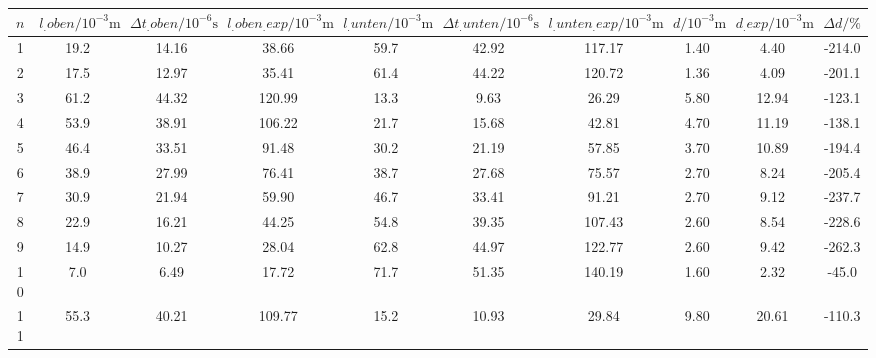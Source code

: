 \label{tab:tabAScan2}
	\begin{tabular}{S[table-format=1.0]S[table-format=2.1]S[table-format=2.2]S[table-format=2.2]S[table-format=2.1]S[table-format=2.2]S[table-format=2.2]S[table-format=2.2]S[table-format=2.2]S[table-format=2.1]}
		\toprule
		{$n$} & {$l_.{oben}/10^{-3}\si{\metre}$} & {$\Delta t_.{oben}/10^{-6}\si{\second}$} & {$l_.{oben_.{exp}}/10^{-3}\si{\metre}$} & {$l_.{unten}/10^{-3}\si{\metre}$} & {$\Delta t_.{unten}/10^{-6}\si{\second}$} & {$l_.{unten_.{exp}}/10^{-3}\si{\metre}$} & {$d/10^{-3}\si{\metre}$} & {$d_.{exp}/10^{-3}\si{\metre}$} & {$\Delta d/\%$} \\
		 & 19.2 & 14.16 & 38.66 & 59.7 & 42.92 & 117.17 & 1.40 & 4.40 & -214.0 \\
		2 & 17.5 & 12.97 & 35.41 & 61.4 & 44.22 & 120.72 & 1.36 & 4.09 & -201.1 \\
		3 & 61.2 & 44.32 & 120.99 & 13.3 & 9.63 & 26.29 & 5.80 & 12.94 & -123.1 \\
		4 & 53.9 & 38.91 & 106.22 & 21.7 & 15.68 & 42.81 & 4.70 & 11.19 & -138.1 \\
		5 & 46.4 & 33.51 & 91.48 & 30.2 & 21.19 & 57.85 & 3.70 & 10.89 & -194.4 \\
		6 & 38.9 & 27.99 & 76.41 & 38.7 & 27.68 & 75.57 & 2.70 & 8.24 & -205.4 \\
		7 & 30.9 & 21.94 & 59.90 & 46.7 & 33.41 & 91.21 & 2.70 & 9.12 & -237.7 \\
		8 & 22.9 & 16.21 & 44.25 & 54.8 & 39.35 & 107.43 & 2.60 & 8.54 & -228.6 \\
		9 & 14.9 & 10.27 & 28.04 & 62.8 & 44.97 & 122.77 & 2.60 & 9.42 & -262.3 \\
		10 & 7.0 & 6.49 & 17.72 & 71.7 & 51.35 & 140.19 & 1.60 & 2.32 & -45.0 \\
		11 & 55.3 & 40.21 & 109.77 & 15.2 & 10.93 & 29.84 & 9.80 & 20.61 & -110.3 \\
		\bottomrule
	\end{tabular}

